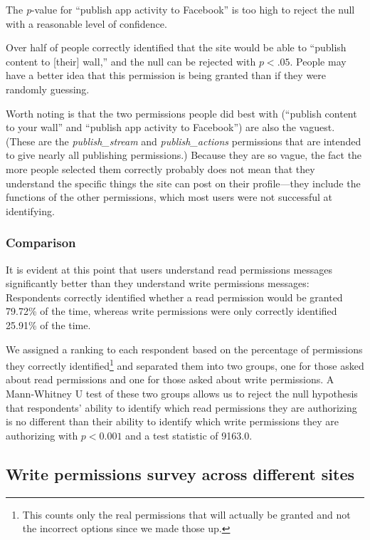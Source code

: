 \documentclass[10pt]{sig-alternate-10pt}
\begin{document}
The \emph{p}-value for ``publish app activity to Facebook'' is too high to reject the null with a reasonable level of confidence. 

Over half of people correctly identified that the site would be able to ``publish content to [their] wall,'' and the null can be rejected with $p < .05$. People may have a better idea that this permission is being granted than if they were randomly guessing. 

Worth noting is that the two permissions people did best with (``publish content to your wall'' and ``publish app activity to Facebook'') are also the vaguest. (These are the \emph{publish\_stream} and \emph{publish\_actions} permissions that are intended to give nearly all publishing permissions.) Because they are so vague, the fact the more people selected them correctly probably does not mean that they understand the specific things the site can post on their profile---they include the functions of the other permissions, which most users were not successful at identifying.

\subsubsection{Comparison}

It is evident at this point that users understand read permissions messages significantly better than they understand write permissions messages: Respondents correctly identified whether a read permission would be granted 79.72\% of the time, whereas write permissions were only correctly identified 25.91\% of the time.

We assigned a ranking to each respondent based on the percentage of permissions they correctly identified\footnote{This counts only the real permissions that will actually be granted and not the incorrect options since we made those up.} and separated them into two groups, one for those asked about read permissions and one for those asked about write permissions.  A Mann-Whitney U test of these two groups allows us to reject the null hypothesis that respondents’ ability to identify which read permissions they are authorizing is no different than their ability to identify which write permissions they are authorizing with $p < 0.001$ and a test statistic of 9163.0.

\subsection{Write permissions survey across different sites}
\label{sec:multisite}
\end{document}
